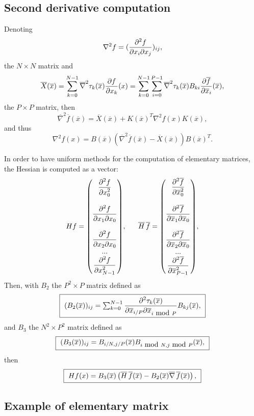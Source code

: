 \documentclass[11pt,a4paper]{article}
\begin{document}
\subsection{Second derivative computation}
Denoting 
$$ \nabla^2 f = ({{\displaystyle \frac{\displaystyle \partial^2 f}{\displaystyle \partial x_i \partial x_j}}})_{ij}, $$
the $N \times N$ matrix and
$$ \overline{X}(\overline{x}) = \sum_{k = 0}^{N-1} \overline{\nabla}^2 \tau_k(\overline{x}) {\displaystyle \frac{\displaystyle \partial f}{\displaystyle \partial x_k}}(x) = \sum_{k = 0}^{N-1} \sum_{i = 0}^{P-1} \overline{\nabla}^2 \tau_k(\overline{x}) B_{ki} {\displaystyle \frac{\displaystyle \partial \overline{f}}{\displaystyle \partial \overline{x}_i}}(\overline{x}), $$
the $P \times P$ matrix, then
$$ \overline{\nabla}^2 \overline{f}(\overline{x}) = \overline{X}(\overline{x}) + K(\overline{x})^T \nabla^2 f(x) K(\overline{x}), $$
and thus
$$ \nabla^2 f(x) = B(\overline{x}) (\overline{\nabla}^2 \overline{f}(\overline{x}) - \overline{X}(\overline{x})) B(\overline{x})^T. $$

In order to have uniform methods for the computation of elementary matrices, the Hessian is computed as a vector:
$$  H f = \vecseven{\Frac{\partial^2 f}{\partial x^2_0}}{}{\Frac{\partial^2 f}{\partial x_1 \partial x_0}}{}{\Frac{\partial^2 f}{\partial x_2 \partial x_0}}{...}{\Frac{\partial^2 f}{\partial x^2_{N-1}}},\ \ \ \ \ 
    \overline{H}\,\overline{f} = \vecseven{\Frac{\partial^2 \overline{f}}{\partial \overline{x}^2_0}}{}{\Frac{\partial^2 \overline{f}}{\partial \overline{x}_1 \partial \overline{x}_0}}{}{\Frac{\partial^2 \overline{f}}{\partial \overline{x}_2 \partial \overline{x}_0}}{...}{\Frac{\partial^2 \overline{f}}{\partial \overline{x}^2_{P-1}}}, $$
Then, with $B_2$ the $P^2 \times P$ matrix defined as
$$ \fbox{ $(B_2(\overline{x}))_{ij} = \sum_{k = 0}^{N-1} {\displaystyle \frac{\displaystyle \partial^2 \tau_k(\overline{x})}{\displaystyle \partial \overline{x}_{i / P} \partial \overline{x}_{i \mbox{ mod } P} }} B_{kj}(\overline{x}),$ } $$
and $B_3$ the $N^2 \times P^2$ matrix defined as
$$ \fbox{ $(B_3(\overline{x}))_{ij} = B_{i / N, j / P}(\overline{x}) B_{i \mbox{ mod } N, j \mbox{ mod } P}(\overline{x}), $ } $$
then
$$ \fbox{ $H f(x) = B_3(\overline{x}) \left(\overline{H}\,\overline{f}(\overline{x}) - B_2(\overline{x})\overline{\nabla}\,\overline{f}(\overline{x})\right), $ } $$

\subsection{Example of elementary matrix} \label{elmminst}
\end{document}

